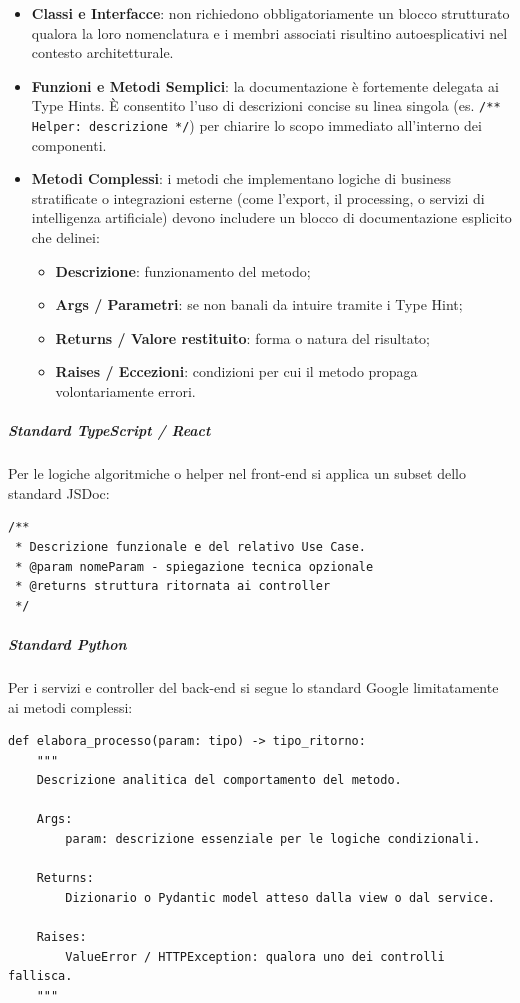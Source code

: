 \documentclass[a4paper, 11pt, oneside]{scrartcl}
\begin{document}
\begin{itemize}
    \item \textbf{Classi e Interfacce}: non richiedono obbligatoriamente un blocco strutturato qualora la loro nomenclatura e i membri associati risultino autoesplicativi nel contesto architetturale.
    \item \textbf{Funzioni e Metodi Semplici}: la documentazione è fortemente delegata ai Type Hints. È consentito l'uso di descrizioni concise su linea singola (es. \texttt{/** Helper: descrizione */}) per chiarire lo scopo immediato all'interno dei componenti.
    \item \textbf{Metodi Complessi}: i metodi che implementano logiche di business stratificate o integrazioni esterne (come l'export, il processing, o servizi di intelligenza artificiale) devono includere un blocco di documentazione esplicito che delinei:
    \begin{itemize}
        \item \textbf{Descrizione}: funzionamento del metodo;
        \item \textbf{Args / Parametri}: se non banali da intuire tramite i Type Hint;
        \item \textbf{Returns / Valore restituito}: forma o natura del risultato;
        \item \textbf{Raises / Eccezioni}: condizioni per cui il metodo propaga volontariamente errori.
    \end{itemize}
\end{itemize}

\subparagraph{Standard TypeScript / React}
Per le logiche algoritmiche o helper nel front-end si applica un subset dello standard JSDoc:
\begin{verbatim}
/**
 * Descrizione funzionale e del relativo Use Case.
 * @param nomeParam - spiegazione tecnica opzionale
 * @returns struttura ritornata ai controller
 */
\end{verbatim}

\subparagraph{Standard Python}
Per i servizi e controller del back-end si segue lo standard Google limitatamente ai metodi complessi:
\begin{verbatim}
def elabora_processo(param: tipo) -> tipo_ritorno:
    """
    Descrizione analitica del comportamento del metodo.

    Args:
        param: descrizione essenziale per le logiche condizionali.

    Returns:
        Dizionario o Pydantic model atteso dalla view o dal service.

    Raises:
        ValueError / HTTPException: qualora uno dei controlli fallisca.
    """
\end{verbatim}
\end{document}
